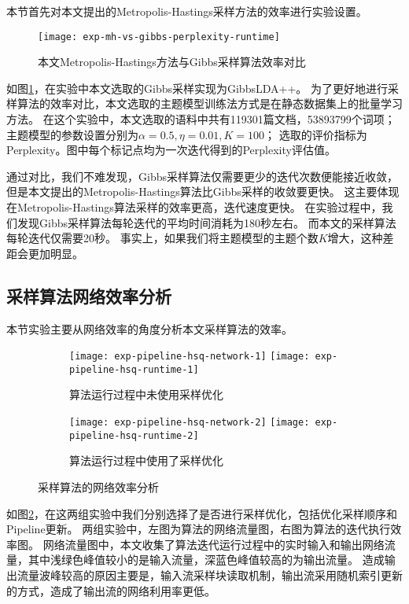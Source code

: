 本节首先对本文提出的Metropolis-Hastings采样方法的效率进行实验设置。
\begin{figure}[htb]\centering
\texttt{[image: exp-mh-vs-gibbs-perplexity-runtime]}
\caption{本文Metropolis-Hastings方法与Gibbs采样算法效率对比}
\label{fig:mh-vs-gibbs}       %
\end{figure}

如图\ref{fig:mh-vs-gibbs}，在实验中本文选取的Gibbs采样实现为GibbsLDA++\cite{gibbsLda++}。
为了更好地进行采样算法的效率对比，本文选取的主题模型训练法方式是在静态数据集上的批量学习方法。
在这个实验中，本文选取的语料中共有119301篇文档，53893799个词项；
主题模型的参数设置分别为$\alpha = 0.5, \eta = 0.01, K = 100$；
选取的评价指标为Perplexity。图中每个标记点均为一次迭代得到的Perplexity评估值。

通过对比，我们不难发现，Gibbs采样算法仅需要更少的迭代次数便能接近收敛，
但是本文提出的Metropolis-Hastings算法比Gibbs采样的收敛要更快。
这主要体现在Metropolis-Hastings算法采样的效率更高，迭代速度更快。
在实验过程中，我们发现Gibbs采样算法每轮迭代的平均时间消耗为180秒左右。
而本文的采样算法每轮迭代仅需要20秒。
事实上，如果我们将主题模型的主题个数$K$增大，这种差距会更加明显。

\subsection{采样算法网络效率分析}

本节实验主要从网络效率的角度分析本文采样算法的效率。
\begin{figure}[htb]\centering
\begin{subfigure}{1\textwidth}
\texttt{[image: exp-pipeline-hsq-network-1]}
\texttt{[image: exp-pipeline-hsq-runtime-1]}
\caption{算法运行过程中未使用采样优化}
\end{subfigure}
\begin{subfigure}{1\textwidth}
\texttt{[image: exp-pipeline-hsq-network-2]}
\texttt{[image: exp-pipeline-hsq-runtime-2]}
\caption{算法运行过程中使用了采样优化}
\end{subfigure}
\caption{采样算法的网络效率分析}
\label{fig:exp-pipeline}       %
\end{figure}

如图\ref{fig:exp-pipeline}，在这两组实验中我们分别选择了是否进行采样优化，包括优化采样顺序和Pipeline更新。
两组实验中，左图为算法的网络流量图，右图为算法的迭代执行效率图。
网络流量图中，本文收集了算法迭代运行过程中的实时输入和输出网络流量，其中浅绿色峰值较小的是输入流量，深蓝色峰值较高的为输出流量。
造成输出流量波峰较高的原因主要是，输入流采样块读取机制，输出流采用随机索引更新的方式，造成了输出流的网络利用率更低。

